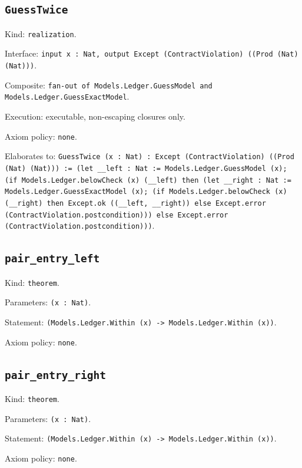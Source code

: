\documentclass[11pt]{article}
\begin{document}
\subsection*{\texttt{GuessTwice}}
\noindent Kind: \texttt{realization}.\par
\noindent Interface: \texttt{input x : Nat, output Except (ContractViolation) ((Prod (Nat) (Nat)))}.\par
\noindent Composite: \texttt{fan-out of Models.Ledger.GuessModel and Models.Ledger.GuessExactModel}.\par
\noindent Execution: executable, non-escaping closures only.\par
\noindent Axiom policy: \texttt{none}.\par
\noindent Elaborates to: \texttt{GuessTwice (x : Nat) : Except (ContractViolation) ((Prod (Nat) (Nat))) := (let \_\_left : Nat := Models.Ledger.GuessModel (x); (if Models.Ledger.belowCheck (x) (\_\_left) then (let \_\_right : Nat := Models.Ledger.GuessExactModel (x); (if Models.Ledger.belowCheck (x) (\_\_right) then Except.ok ((\_\_left, \_\_right)) else Except.error (ContractViolation.postcondition))) else Except.error (ContractViolation.postcondition)))}.\par
\subsection*{\texttt{pair\_entry\_left}}
\noindent Kind: \texttt{theorem}.\par
\noindent Parameters: \texttt{(x : Nat)}.\par
\noindent Statement: \texttt{(Models.Ledger.Within (x) -> Models.Ledger.Within (x))}.\par
\noindent Axiom policy: \texttt{none}.\par
\subsection*{\texttt{pair\_entry\_right}}
\noindent Kind: \texttt{theorem}.\par
\noindent Parameters: \texttt{(x : Nat)}.\par
\noindent Statement: \texttt{(Models.Ledger.Within (x) -> Models.Ledger.Within (x))}.\par
\noindent Axiom policy: \texttt{none}.\par
\end{document}
